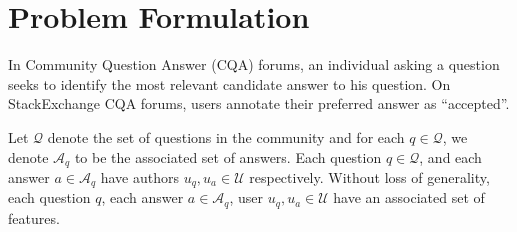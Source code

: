 \section{Problem Formulation}
\label{sec:problem}

In Community Question Answer (CQA) forums, an individual asking a question seeks to identify the most relevant candidate answer to his question. On StackExchange CQA forums, users annotate their preferred answer as ``accepted''.


Let $\mathcal{Q}$ denote the set of questions in the community and for each $q \in \mathcal{Q}$, we denote $\mathcal{A}_q$ to be the associated set of answers. Each question $q \in \mathcal{Q}$, and each answer $a \in \mathcal{A}_q$ have authors $u_q, u_a \in \mathcal{U}$ respectively. Without loss of generality, each question $q$, each answer $a \in \mathcal{A}_q$, user $u_q, u_a \in \mathcal{U}$ have an associated set of features.

